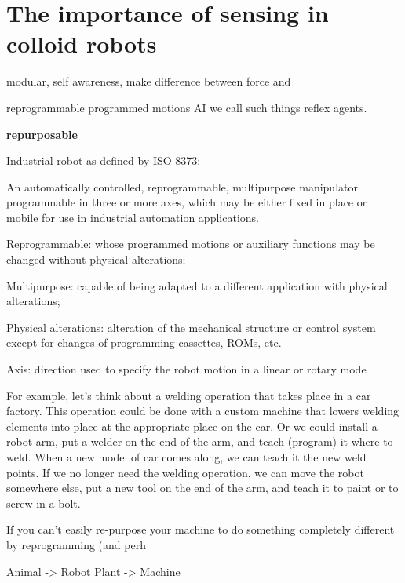 \section{The importance of  sensing in colloid robots}
modular, self awareness, make difference between force and 

reprogrammable 
 programmed motions
  AI we call such things reflex agents. 
  
  \textbf{repurposable}
  
  Industrial robot as defined by ISO 8373:

An automatically controlled, reprogrammable, multipurpose manipulator programmable in three or more axes, which may be either fixed in place or mobile for use in industrial automation applications.

Reprogrammable: whose programmed motions or auxiliary functions may be changed without physical alterations;

Multipurpose: capable of being adapted to a different application with physical alterations;

Physical alterations: alteration of the mechanical structure or control system except for changes of programming cassettes, ROMs, etc.

Axis: direction used to specify the robot motion in a linear or rotary mode

For example, let's think about a welding operation that takes place in a car factory. This operation could be done with a custom machine that lowers welding elements into place at the appropriate place on the car. Or we could install a robot arm, put a welder on the end of the arm, and teach (program) it where to weld. When a new model of car comes along, we can teach it the new weld points. If we no longer need the welding operation, we can move the robot somewhere else, put a new tool on the end of the arm, and teach it to paint or to screw in a bolt.

 If you can't easily re-purpose your machine to do something completely different by reprogramming (and perh
 
 Animal -> Robot
Plant -> Machine


